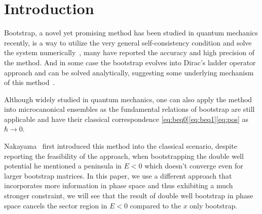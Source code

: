 \documentclass[aps, preprint,amsmath, amssymb]{revtex4-2}
\begin{document}
\maketitle

\section{Introduction}
Bootstrap, a novel yet promising method has been studied in quantum mechanics recently, is a way to utilize the very general self-consistency condition and solve the system numerically~\cite{Han_2020}\cite{Bhattacharya:2021btd}\cite{Berenstein:2021loy}, many have reported the accuracy and high precision of the method. And in some case the bootstrap evolves into Dirac's ladder operator approach and can be solved analytically, suggesting some underlying mechanism of this method~\cite{Aikawa:2021qbl}.

Although widely studied in quantum mechanics, one can also apply the method into microcanonical ensembles as the fundamental relations of bootstrap are still applicable and have their classical correspondence \eqref{eq:beq0}\eqref{eq:beq1}\eqref{eq:pos} as $\hbar \to 0$. 

Nakayama~\cite{Nakayama_2022} first introduced this method into the classical scenario, despite reporting the feasibility of the approach, when bootstrapping the double well potential he mentioned a peninsula in $ E < 0$ which doesn't converge even for larger bootstrap matrices. In this paper, we use a different approach that incorporates more information in phase space and thus exhibiting a much stronger constraint, we will see that the result of double well bootstrap in phase space cancels the sector region in $E < 0$ compared to the $x$ only bootstrap.
\end{document}
